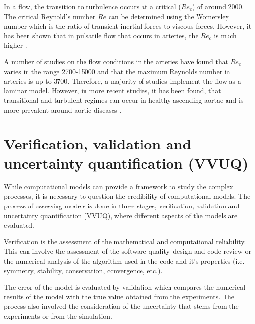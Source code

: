 In a flow, the transition to turbulence occurs at a critical ($Re_c$) of around 2000. The critical Reynold's number $Re$ can be determined using the Womersley number which is the ratio of transient inertial forces to viscous forces. However, it has been shown that in pulsatile flow that occurs in arteries, the $Re_c$ is much higher \cite{Alimohammadi2015PredictingApproach}.\par

A number of studies on the flow conditions in the arteries have found that $Re_c$ varies in the range 2700-15000 and that the maximum Reynolds number in arteries is up to 3700. Therefore, a majority of studies implement the flow as a laminar model. However, in more recent studies, it has been found, that transitional and turbulent regimes can occur in healthy ascending aortae and is more prevalent around aortic diseases \cite{Ku1997BLOODARTERIES}. \par




\section{Verification, validation and uncertainty quantification (VVUQ)}
While computational models can provide a framework to study the complex processes, it is necessary to question the credibility of computational models. The process of assessing models is done in three stages, verification, validation and uncertainty quantification (VVUQ), where different aspects of the models are evaluated. \par

Verification is the assessment of the mathematical and computational reliability. This can involve the assessment of the software quality, design and code review or the numerical analysis of the algorithm used in the code and it's properties (i.e. symmetry, stability, conservation, convergence, etc.). \par

The error of the model is evaluated by validation which compares the numerical results of the model with the true value obtained from the experiments. The process also involved the consideration of the uncertainty that stems from the experiments or from the simulation. 
